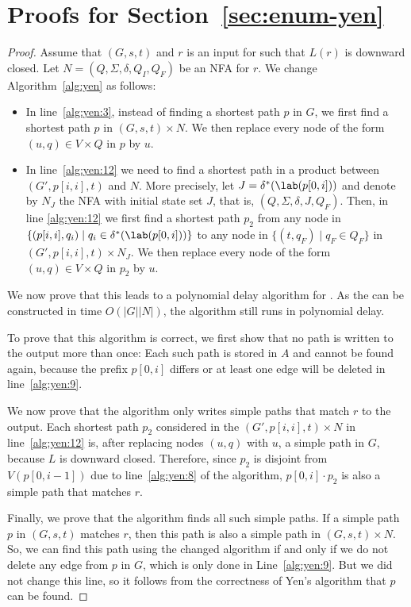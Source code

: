 \documentclass[a4paper,english]{lipics-v2016}
\theoremstyle{plain}
\begin{document}
\section{Proofs for Section~\ref{sec:enum-yen}}\label{app:enum-yen}
\propprefixclosed*
\begin{proof}
  Assume that $(G,s,t)$ and $r$ is an input for \enumnodespaths such that
  $L(r)$ is downward closed. Let $N = (Q,\Sigma,\delta, Q_I, Q_F)$ be
  an NFA for $r$.  We change Algorithm~\ref{alg:yen} as follows:
  \begin{itemize}
  \item In line~\ref{alg:yen:3}, instead of finding a shortest path
    $p$ in $G$, we first find a shortest path $p$ in $(G,s,t) \times
    N$. We then replace every node of the form $(u,q) \in V\times Q$
    in $p$ by $u$.
  \item In line~\ref{alg:yen:12} we need to find a shortest path in a
    product between $(G',p[i,i],t)$ and $N$. More precisely, let $J =
    \delta^*(\lab(p[0,i]))$ and denote by $N_J$ the NFA with initial
    state set $J$, that is, $(Q,\Sigma,\delta,J,Q_F)$. Then, in line
    \ref{alg:yen:12} we first find a shortest path $p_2$ from any node
    in $\{(p[i,i],q_i) \mid q_i \in \delta^*(\lab(p[0,i]))\}$ to any
    node in $\{(t,q_F) \mid q_F \in Q_F\}$ in $(G',p[i,i],t) \times
    N_J$. We then replace every node of the form $(u,q) \in V\times Q$
    in $p_2$ by $u$.
  \end{itemize}

  
  \fbox{$\cdots$} We now prove that this leads to a polynomial delay algorithm for
  \enumnodespaths.  As the \productautomaton can be constructed in time
  $O(|G||N|)$, the algorithm still runs in polynomial delay. 

  To prove that this algorithm is correct, we first show that no path
  is written to the output more than once: Each such path is stored in
  $A$ and cannot be found again, because the prefix $p[0,i]$ differs
  or at least one edge will be deleted in line~\ref{alg:yen:9}.

  We now prove that the algorithm only writes simple paths that match
  $r$ to the output. Each shortest path $p_2$ considered in the
  \productautomaton $(G',p[i,i],t) \times N$ in line~\ref{alg:yen:12} is, after
  replacing nodes $(u,q)$ with $u$, a simple path in $G$, because $L$
  is downward closed.
        Therefore, since $p_2$ is disjoint from $V(p[0,i-1])$ due to
  line~\ref{alg:yen:8} of the algorithm, $p[0,i]\cdot p_2$ is also a simple
  path that matches $r$.

 
  Finally, we prove that the algorithm finds all such simple paths.
      If a simple path $p$ in $(G,s,t)$ matches $r$, then this path is also a
  simple path in $(G,s,t) \times N$. So, we can find this path using the
  changed algorithm if and only if we do not delete any edge from $p$
  in $G$, which is only done in Line~\ref{alg:yen:9}.  But we did
  not change this line, so it follows from the correctness of Yen's
  algorithm that $p$ can be found.
\end{proof}
\end{document}
